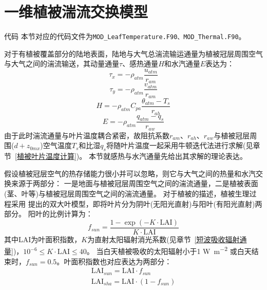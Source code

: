 \section{一维植被湍流交换模型}\label{一维植被湍流交换模型}
\begin{mymdframed}{代码}
本节对应的代码文件为\texttt{MOD\_LeafTemperature.F90、MOD\_Thermal.F90}。
\end{mymdframed}

对于有植被覆盖部分的陆地表面，陆地与大气总湍流输运通量为植被冠层周围空气与大气之间的湍流输送，其动量通量$\tau$、感热通量$H$和水汽通量$E$表达为：
\begin{equation}
\tau_{x}=-\rho_{atm} \frac{u_{atm}}{r_{a m}}
\end{equation}
\begin{equation}
\tau_{y}=-\rho_{atm} \frac{v_{atm}}{r_{a m}}
\end{equation}
\begin{equation}
H=-\rho_{atm} C_{p a} \frac{\theta_{atm}-T_{s}}{r_{a h}}
\end{equation}
\begin{equation}
E=-\rho_{atm} \frac{q_{atm}-q_{s}}{r_{a w}}
\end{equation}
由于此时湍流通量与叶片温度耦合紧密，故阻抗系数$r_{am}$、$r_{ah}$、$r_{aw}$与植被冠层周围($d+z_{0mx}$)空气温度$T_s$和比湿$q_s$将随叶片温度一起采用牛顿迭代法进行求解(见章节~\ref{植被叶片温度计算})。
本节就感热与水汽通量先给出其求解的理论表达。


假设植被冠层空气的热存储能力很小并可以忽略，则它与大气之间的热量和水汽交换来源于两部分：
一是地面与植被冠层周围空气之间的湍流通量，二是植被表面(茎、叶等)与植被冠层周围空气之间的湍流通量。
对于植被的描述，植被生理过程采用 \citet{dai2004two}提出的双大叶模型，即将叶片分为阴叶(无阳光直射)与阳叶(有阳光直射)两部分。
阳叶的比例计算为：
\begin{equation}
f_{sun}=\frac{1-\exp (-K \cdot \text {LAI})}{K \cdot \text {LAI}}
\end{equation}
其中LAI为叶面积指数，$K$为直射太阳辐射消光系数(见章节~\ref{短波吸收辐射通量})，${10}^{-6}\le K \cdot \text {LAI}\le40$。
当白天植被吸收的太阳辐射小于1 \unit{W.m^{-2}} 或白天结束时，$f_{sun}=0.5$。叶面积指数也对应表达为两部分：
\begin{equation}
\begin{array}{c} \text {LAI}_{sun}= \text {LAI} \cdot f_{sun} \\ \text {LAI}_{sha}=\text {LAI} \cdot \left(1-f_{sun}\right)\end{array}
\end{equation}

